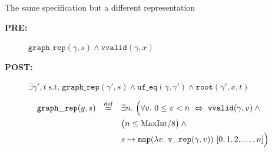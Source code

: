 \documentclass[professionalfonts, xcolor=table]{beamer}
\newcommand{\defeq}{\mathbin{\overset{\mathrm{def}}{=}}}
\begin{document}
\begin{frame}{The same specification but a different representation}
  \centering
  \colorbox{lightg}{\parbox{.9\textwidth}{
      \begin{description}
      \item[{\bf PRE:}] $\mathtt{graph\_rep}(\gamma, s)
        \wedge \mathtt{vvalid}(\gamma, x)$
      \item[{\bf POST:}] $\exists \gamma', t\;\text{s.t.}\;\mathtt{graph\_rep}
        (\gamma', s)\wedge\mathtt{uf\_eq}(\gamma, \gamma') \wedge \mathtt{root}
        (\gamma', x, t)$
  \end{description}}}
  \pause
  \vskip20pt
  \colorbox{lightg}{\parbox{.9\textwidth}{
      \begin{align*}
        \mathtt{graph\_rep}(g, s) \quad \defeq \quad & \exists n.~
        \Big(\forall v.~ 0\leq v < n ~ \Leftrightarrow ~ \mathtt{vvalid}(\gamma, v)
        \wedge \null\\
      & \big(n \leq \mathrm{MaxInt}/8\big) \wedge \null \\
        & s \mapsto \mathtt{map}(\lambda v.~ \mathtt{v\_rep}(\gamma, v)) ~
               [0,1,2,\dots,n]\Big)
      \end{align*}
    }}
\end{frame}
\end{document}

